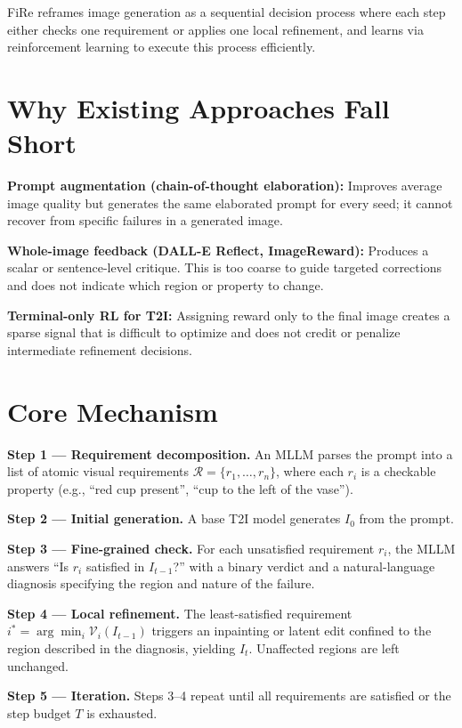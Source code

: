 \documentclass[10pt,twocolumn]{article}
\begin{document}
FiRe reframes image generation as a sequential decision process where each step
either checks one requirement or applies one local refinement, and learns via
reinforcement learning to execute this process efficiently.

\section{Why Existing Approaches Fall Short}

\textbf{Prompt augmentation (chain-of-thought elaboration):}
Improves average image quality but generates the same elaborated prompt for
every seed; it cannot recover from specific failures in a generated image.

\textbf{Whole-image feedback (DALL-E Reflect, ImageReward):}
Produces a scalar or sentence-level critique. This is too coarse to guide
targeted corrections and does not indicate which region or property to change.

\textbf{Terminal-only RL for T2I:}
Assigning reward only to the final image creates a sparse signal that is
difficult to optimize and does not credit or penalize intermediate refinement
decisions.

\section{Core Mechanism}

\textbf{Step 1 --- Requirement decomposition.}
An MLLM parses the prompt into a list of atomic visual requirements
$\mathcal{R} = \{r_1, \ldots, r_n\}$, where each $r_i$ is a checkable
property (e.g., ``red cup present'', ``cup to the left of the vase'').

\textbf{Step 2 --- Initial generation.}
A base T2I model generates $I_0$ from the prompt.

\textbf{Step 3 --- Fine-grained check.}
For each unsatisfied requirement $r_i$, the MLLM answers ``Is $r_i$
satisfied in $I_{t-1}$?'' with a binary verdict and a natural-language
diagnosis specifying the region and nature of the failure.

\textbf{Step 4 --- Local refinement.}
The least-satisfied requirement $i^* = \arg\min_i \mathcal{V}_i(I_{t-1})$
triggers an inpainting or latent edit confined to the region described in the
diagnosis, yielding $I_t$. Unaffected regions are left unchanged.

\textbf{Step 5 --- Iteration.}
Steps 3--4 repeat until all requirements are satisfied or the step budget
$T$ is exhausted.
\end{document}
